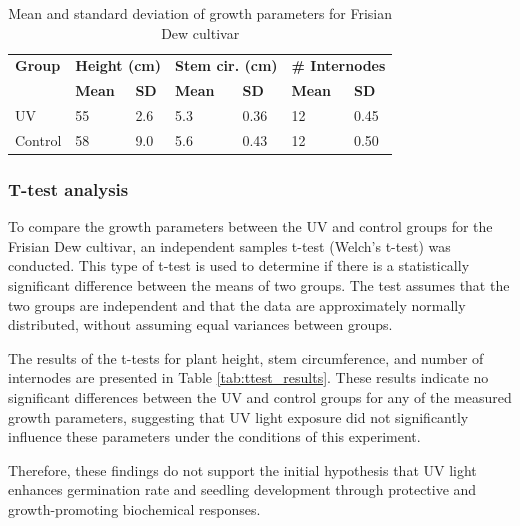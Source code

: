 \begin{table}[htbp]
    \caption[Mean and standard deviation of growth parameters]{Mean and standard deviation of growth parameters for Frisian Dew cultivar}
    \label{tab:descriptive_statistics}
    \begin{tabularx}{\linewidth}{l|XX|XX|XX}
        \toprule
        \textbf{Group} & \multicolumn{2}{l|}{\textbf{Height (\unit[mode=text]{\cm})}} & \multicolumn{2}{l|}{\textbf{Stem cir. (\unit[mode=text]{\cm})}} & \multicolumn{2}{l}{\textbf{\# Internodes}} \\
        & \textbf{Mean} & \textbf{SD} & \textbf{Mean} & \textbf{SD} & \textbf{Mean} & \textbf{SD} \\
        \midrule
        UV & \num[mode=text]{55} & \num[mode=text]{2.6} & \num[mode=text]{5.3} & \num[mode=text]{0.36} & \num[mode=text]{12} & \num[mode=text]{0.45} \\
        Control & \num[mode=text]{58} & \num[mode=text]{9.0} & \num[mode=text]{5.6} & \num[mode=text]{0.43} & \num[mode=text]{12} & \num[mode=text]{0.50} \\
        \bottomrule
    \end{tabularx}
\end{table}

\subsubsection{T-test analysis}

To compare the growth parameters between the UV and control groups for the Frisian Dew cultivar, an independent samples t-test (Welch's t-test) was conducted. This type of t-test is used to determine if there is a statistically significant difference between the means of two groups. The test assumes that the two groups are independent and that the data are approximately normally distributed, without assuming equal variances between groups.

The results of the t-tests for plant height, stem circumference, and number of internodes are presented in Table \ref{tab:ttest_results}. These results indicate no significant differences between the UV and control groups for any of the measured growth parameters, suggesting that UV light exposure did not significantly influence these parameters under the conditions of this experiment.

Therefore, these findings do not support the initial hypothesis that UV light enhances germination rate and seedling development through protective and growth-promoting biochemical responses.

